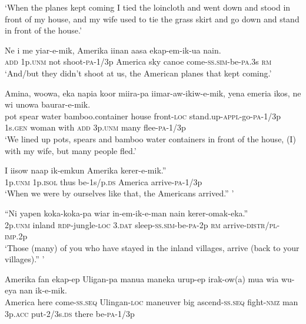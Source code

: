 {\glt ‘When the planes kept coming I tied the loincloth and went down and stood in front of my house, and my wife used to tie the grass skirt and go down and stand in front of the house.’ \\
\z


\ea\label{ex:a:x116}
\gll  Ne  i  me  yiar-e-mik,  Amerika  iinan  aasa      ekap-em-ik-ua  nain. \\
\textsc{add}  1p.\textsc{unm}  not  shoot-\textsc{pa}-1/3p  America  sky  canoe    come-\textsc{ss}.\textsc{sim}-be-\textsc{pa}.3s  \textsc{rm} \\


\glt ‘And/but they didn’t shoot at us, the American planes that kept coming.’ \\
\z


\ea\label{ex:a:x117}
\gll  Amina,  woowa,  eka  napia  koor  miira-pa       iimar-aw-ikiw-e-mik,  yena  emeria  ikos,  ne        wi  unowa  baurar-e-mik. \\
pot  spear  water  bamboo.container  house  front-\textsc{loc}  stand.up-\textsc{appl}-go-\textsc{pa}-1/3p  1s.\textsc{gen}  woman  with  \textsc{add}   3p.\textsc{unm}  many  flee-\textsc{pa}-1/3p \\




\glt ‘We lined up pots, spears and bamboo water containers in front of the house, (I) with my wife, but many people fled.’ \\
\z


\ea\label{ex:a:x118}
\gll  I  iisow  naap  ik-emkun  Amerika  kerer-e-mik.” \\
1p.\textsc{unm}  1p.\textsc{isol}  thus  be-1s/p.\textsc{ds}  America  arrive-\textsc{pa}-1/3p \\
\glt ‘When we were by ourselves like that, the Americans arrived.” ’ \\
\z


\ea\label{ex:a:x119}
\gll  “Ni  yapen  koka-koka-pa  wiar  in-em-ik-e-man          nain  kerer-omak-eka.” \\
2p.\textsc{unm}  inland  \textsc{rdp}-jungle-\textsc{loc}  3.\textsc{dat}  sleep-\textsc{ss}.\textsc{sim}-be-\textsc{pa}-2p  \textsc{rm}  arrive-\textsc{distr}/\textsc{pl}-\textsc{imp}.2p \\


\glt ‘Those (many) of you who have stayed in the inland villages, arrive (back to your villages).” ’ \\
\z


\ea\label{ex:a:x120}
\gll  Amerika  fan  ekap-ep  Uligan-pa  manua  maneka   urup-ep  irak-ow(a)  mua  wia  wu-eya  nan                   ik-e-mik. \\
America  here  come-\textsc{ss.seq}  Ulingan-\textsc{loc}  maneuver  big  ascend-\textsc{ss.seq}  fight-\textsc{nmz}  man  3p.\textsc{acc}  put-2/3s.\textsc{ds}  there    be-\textsc{pa}-1/3p \\




}
